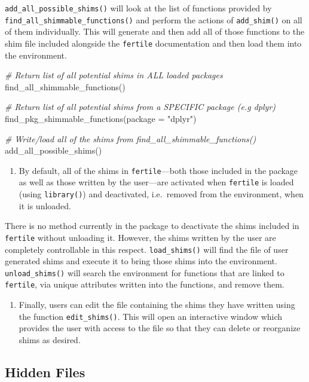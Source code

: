 \documentclass[12pt,twoside]{reedthesis}
\newenvironment{Shaded}{\begin{snugshade}}{\end{snugshade}}
\newcommand{\AttributeTok}[1]{\textcolor[rgb]{0.77,0.63,0.00}{#1}}
\newcommand{\CommentTok}[1]{\textcolor[rgb]{0.56,0.35,0.01}{\textit{#1}}}
\newcommand{\FunctionTok}[1]{\textcolor[rgb]{0.00,0.00,0.00}{#1}}
\newcommand{\NormalTok}[1]{#1}
\newcommand{\StringTok}[1]{\textcolor[rgb]{0.31,0.60,0.02}{#1}}
\providecommand{\tightlist}{%
  \setlength{\itemsep}{0pt}\setlength{\parskip}{0pt}}
\begin{document}
\texttt{add\_all\_possible\_shims()} will look at the list of functions provided by \texttt{find\_all\_shimmable\_functions()} and perform the actions of \texttt{add\_shim()} on all of them individually. This will generate and then add all of those functions to the shim file included alongside the \texttt{fertile} documentation and then load them into the environment.
\begin{Shaded}
\begin{Highlighting}[]
\CommentTok{\# Return list of all potential shims in ALL loaded packages}
\FunctionTok{find\_all\_shimmable\_functions}\NormalTok{()}

\CommentTok{\# Return list of all potential shims from a SPECIFIC package (e.g dplyr)}
\FunctionTok{find\_pkg\_shimmable\_functions}\NormalTok{(}\AttributeTok{package =} \StringTok{"dplyr"}\NormalTok{)}

\CommentTok{\# Write/load all of the shims from find\_all\_shimmable\_functions()}
\FunctionTok{add\_all\_possible\_shims}\NormalTok{()}
\end{Highlighting}
\end{Shaded}
\begin{enumerate}
\def\labelenumi{\arabic{enumi}.}
\setcounter{enumi}{2}
\tightlist
\item
  By default, all of the shims in \texttt{fertile}---both those included in the package as well as those written by the user---are activated when \texttt{fertile} is loaded (using \texttt{library()}) and deactivated, i.e.~removed from the environment, when it is unloaded.
\end{enumerate}
There is no method currently in the package to deactivate the shims included in \texttt{fertile} without unloading it. However, the shims written by the user are completely controllable in this respect. \texttt{load\_shims()} will find the file of user generated shims and execute it to bring those shims into the environment. \texttt{unload\_shims()} will search the environment for functions that are linked to \texttt{fertile}, via unique attributes written into the functions, and remove them.
\begin{enumerate}
\def\labelenumi{\arabic{enumi}.}
\setcounter{enumi}{3}
\tightlist
\item
  Finally, users can edit the file containing the shims they have written using the function \texttt{edit\_shims()}. This will open an interactive window which provides the user with access to the file so that they can delete or reorganize shims as desired.
\end{enumerate}
\hypertarget{hidden-files}{%
\subsection{Hidden Files}\label{hidden-files}}
\end{document}
